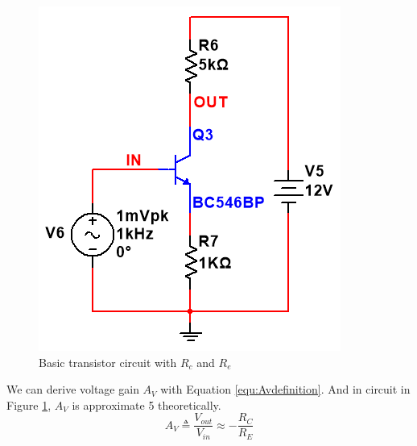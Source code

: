 \begin{figure}[htbp]
\centering
\includegraphics[scale=0.7]{"../Photo/Chap1/basic transistor circuit with Rc and Re"}
\caption{Basic transistor circuit with $R_c$ and $R_e$}
\label{fig:basictransistorcircuitwithRcandRe}
\end{figure}

We can derive voltage gain $A_V$ with Equation \ref{equ:Avdefinition}. And in circuit in Figure \ref{fig:basictransistorcircuitwithRcandRe}, $A_V$ is approximate 5 theoretically.
\begin{equation}
A_V \triangleq \frac{ V_{out}} { V_{in}} \approx -\frac{R_C}{R_E}
\label{equ:Avdefinition}
\end{equation}



